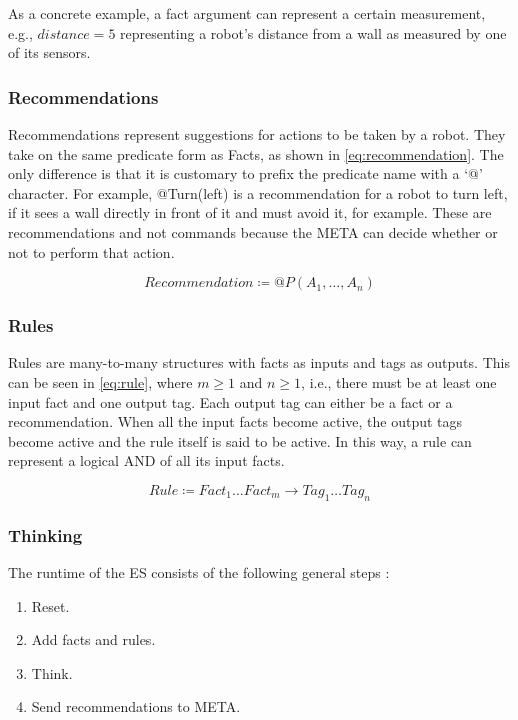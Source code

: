 \documentclass[titlepage,11pt]{article}
\begin{document}
As a concrete example, a fact argument can represent a certain measurement, e.g., $distance = 5$ representing a robot's distance from a wall as measured by one of its sensors.

\subsubsection{Recommendations}
Recommendations represent suggestions for actions to be taken by a robot. They take on the same predicate form as Facts, as shown in \cref{eq:recommendation}. The only difference is that it is customary to prefix the predicate name with a `@' character. For example, @Turn(left) is a recommendation for a robot to turn left, if it sees a wall directly in front of it and must avoid it, for example. These are recommendations and not commands because the META can decide whether or not to perform that action.

\begin{equation} \label{eq:recommendation}
	Recommendation \coloneqq @P(A_1, \ldots, A_n)
\end{equation}

\subsubsection{Rules}
Rules are many-to-many structures with facts as inputs and tags as outputs. This can be seen in \autoref{eq:rule}, where $m \geq 1$ and $n \geq 1$, i.e., there must be at least one input fact and one output tag. Each output tag can either be a fact or a recommendation. When all the input facts become active, the output tags become active and the rule itself is said to be active. In this way, a rule can represent a logical AND of all its input facts.

\begin{equation} \label{eq:rule}
	Rule \coloneqq Fact_1 \ldots Fact_m \rightarrow Tag_1 \ldots Tag_n
\end{equation}

\subsubsection{Thinking}
The runtime of the ES consists of the following general steps \cite{vybihal-expert}:

\begin{enumerate}
	\item Reset.
	\item Add facts and rules.
	\item Think.
	\item Send recommendations to META.
\end{enumerate}
\end{document}
